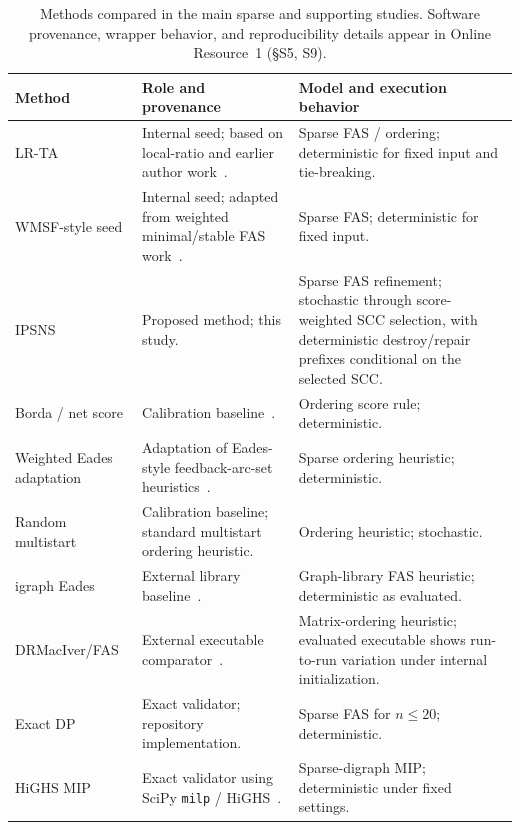 \begin{table}[t]
\caption{Methods compared in the main sparse and supporting studies. Software provenance, wrapper behavior, and reproducibility details appear in Online Resource~1 (\S S5, S9).}
\label{tab:baseline-provenance}
\small
\setlength{\tabcolsep}{4pt}
\renewcommand{\arraystretch}{1.18}
\begin{tabularx}{\textwidth}{@{}p{}p{}X@{}}
\toprule
Method & Role and provenance & Model and execution behavior \\
\midrule
LR-TA &
Internal seed; based on local-ratio and earlier author work~\cite{DF03,VahidiKoutis2024arxiv}. &
Sparse FAS / ordering; deterministic for fixed input and tie-breaking. \\
WMSF-style seed &
Internal seed; adapted from weighted minimal/stable FAS work~\cite{CCP24,CC25}. &
Sparse FAS; deterministic for fixed input. \\
IPSNS &
Proposed method; this study. &
Sparse FAS refinement; stochastic through score-weighted SCC selection, with deterministic destroy/repair prefixes conditional on the selected SCC. \\
Borda / net score &
Calibration baseline~\cite{CFR10}. &
Ordering score rule; deterministic. \\
Weighted Eades adaptation &
Adaptation of Eades-style feedback-arc-set heuristics~\cite{ELS93,EL95}. &
Sparse ordering heuristic; deterministic. \\
Random multistart &
Calibration baseline; standard multistart ordering heuristic. &
Ordering heuristic; stochastic. \\
igraph Eades &
External library baseline~\cite{python_igraph_feedback_arc_set}. &
Graph-library FAS heuristic; deterministic as evaluated. \\
DRMacIver/FAS &
External executable comparator~\cite{drmaciver_feedback_arc_set}. &
Matrix-ordering heuristic; evaluated executable shows run-to-run variation under internal initialization. \\
Exact DP &
Exact validator; repository implementation. &
Sparse FAS for \(n \le 20\); deterministic. \\
HiGHS MIP &
Exact validator using SciPy \texttt{milp} / HiGHS~\cite{HuangfuHall2018}. &
Sparse-digraph MIP; deterministic under fixed settings. \\
\bottomrule
\end{tabularx}
\end{table}
